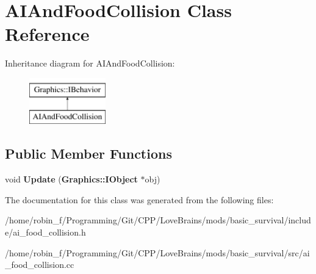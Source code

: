 \section{A\+I\+And\+Food\+Collision Class Reference}
\label{class_a_i_and_food_collision}
Inheritance diagram for A\+I\+And\+Food\+Collision\+:\begin{figure}[H]
\begin{center}
\leavevmode
\includegraphics[height=2.000000cm]{class_a_i_and_food_collision}
\end{center}
\end{figure}
\subsection*{Public Member Functions}
\begin{DoxyCompactItemize}
\item 
void {\bfseries Update} ({\bf Graphics\+::\+I\+Object} $\ast$obj)\label{class_a_i_and_food_collision_a7abb2f65d26c627aabf37a7ff3f4e12f}

\end{DoxyCompactItemize}


The documentation for this class was generated from the following files\+:\begin{DoxyCompactItemize}
\item 
/home/robin\+\_\+f/\+Programming/\+Git/\+C\+P\+P/\+Love\+Brains/mods/basic\+\_\+survival/include/ai\+\_\+food\+\_\+collision.\+h\item 
/home/robin\+\_\+f/\+Programming/\+Git/\+C\+P\+P/\+Love\+Brains/mods/basic\+\_\+survival/src/ai\+\_\+food\+\_\+collision.\+cc\end{DoxyCompactItemize}

